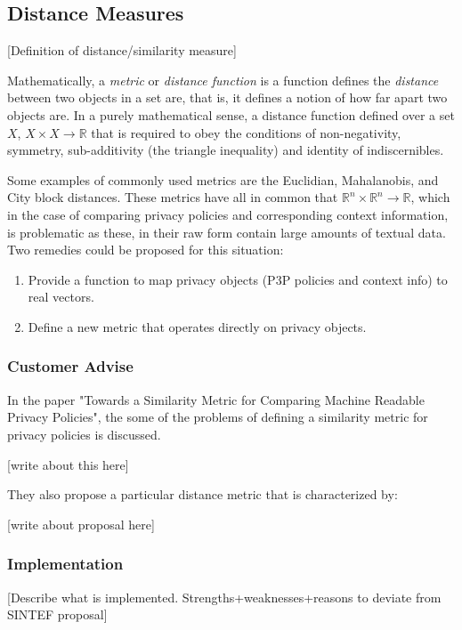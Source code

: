 \subsection{Distance Measures}\label{SimilarityMeasures}

[Definition of distance/similarity measure]

Mathematically, a \emph{metric} or \emph{distance function} is a function defines the \emph{distance} between two objects in a set are, that is, it defines a notion of how far apart two objects are. In a purely mathematical sense, a distance function defined over a set $X$, $X\times X\longrightarrow \mathbb{R}$ that is required to obey the conditions of non-negativity, symmetry, sub-additivity (the triangle inequality) and identity of indiscernibles. 

Some examples of commonly used metrics are the Euclidian, Mahalanobis, and City block distances. These metrics have all in common that $\mathbb{R}^n\times \mathbb{R}^n\longrightarrow \mathbb{R}$, which in the case of comparing privacy policies and corresponding context information, is problematic as these, in their raw form contain large amounts of textual data. Two remedies could be proposed for this situation:

\begin{enumerate}
\item Provide a function to map privacy objects (P3P policies and context info) to real vectors.
\item Define a new metric that operates directly on privacy objects.
\end{enumerate}
 
\subsubsection{Customer Advise}
In the paper "Towards a Similarity Metric for Comparing Machine Readable Privacy Policies", the some of the problems of defining a similarity metric for privacy policies is discussed.

[write about this here]

They also propose a particular distance metric that is characterized by:

[write about proposal here]

\subsubsection{Implementation}
[Describe what is implemented. Strengths+weaknesses+reasons to deviate
from SINTEF proposal]

